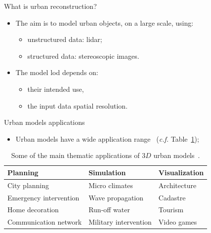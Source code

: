 \documentclass{beamer}
\begin{document}
            \begin{frame}{What is urban reconstruction?}
                \begin{itemize}[label=$\blacktriangleright$, font=\color{IGNGreen}]
                    \item<1-> The aim is to model urban objects, on a large scale, using:
                    \begin{itemize}[label=--]
                        \item<2-> unstructured data: \gls{lidar};
                        \item<3-> structured data: stereoscopic images.
                    \end{itemize}
                    \item<3-> The model \gls{lod} depends on:
                    \begin{itemize}[label=--]
                        \item<4-> their intended use,
                        \item<5-> the input data spatial resolution.
                    \end{itemize}
                \end{itemize}
            \end{frame}

            \begin{frame}{Urban models applications}
                \begin{itemize}[label=$\blacktriangleright$, font=\color{IGNGreen}]
                    \item Urban models have a wide application range~\cite{Biljecki2015} (\textit{c.f.} Table~\ref{tab::3d_applications});
                \end{itemize}
                \begin{table}
                    \begin{center}
                        \begin{tabular}{l l l}
                            \toprule
                            Planning & Simulation & Visualization \\
                            \midrule
                            City planning & Micro climates & Architecture \\
                            Emergency intervention & Wave propagation & Cadastre \\
                            Home decoration & Run-off water & Tourism \\
                            Communication network & Military intervention & Video games \\
                            \bottomrule
                        \end{tabular}
                        \caption{\label{tab::3d_applications} Some of the main thematic applications of $3D$ urban models~\cite{Biljecki2015, Scholze2002}.}
                    \end{center}
                \end{table}
            \end{frame}
\end{document}
